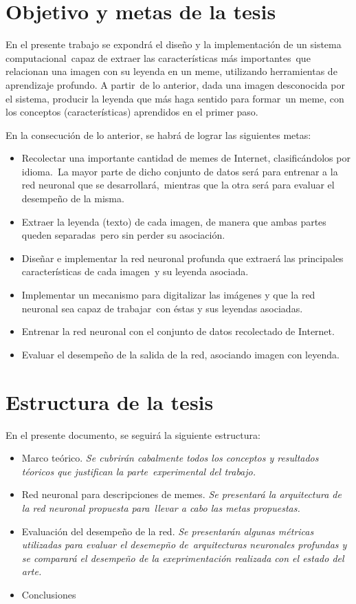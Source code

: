 \section{Objetivo y metas de la tesis}

\noindent
En el presente trabajo se expondrá el diseño y la implementación de un sistema computacional\
capaz de extraer las características más importantes\
que relacionan una imagen con su leyenda en un meme, utilizando herramientas de aprendizaje profundo. A partir\
de lo anterior, dada una imagen desconocida por el sistema, producir la leyenda que más haga sentido para formar\
un meme, con los conceptos (características) aprendidos en el primer paso.\par
En la consecución de lo anterior, se habrá de lograr las siguientes metas:
\begin{itemize}
\item Recolectar una importante cantidad de memes de Internet, clasificándolos por idioma.\
  La mayor parte de dicho conjunto de datos será para entrenar a la red neuronal que se desarrollará,\
  mientras que la otra será para evaluar el desempeño de la misma.
\item Extraer la leyenda (texto) de cada imagen, de manera que ambas partes queden separadas\
  pero sin perder su asociación.
\item Diseñar e implementar la red neuronal profunda que extraerá las principales características de cada imagen\
  y su leyenda asociada.
\item Implementar un mecanismo para digitalizar las imágenes y que la red neuronal sea capaz de trabajar\
  con éstas y sus leyendas asociadas.
\item Entrenar la red neuronal con el conjunto de datos recolectado de Internet.
\item Evaluar el desempeño de la salida de la red, asociando imagen con leyenda.
\end{itemize}

\section{Estructura de la tesis}

\noindent
En el presente documento, se seguirá la siguiente estructura:
\begin{itemize}
\item Marco teórico. \emph{Se cubrirán cabalmente todos los conceptos y resultados téoricos que justifican la parte}\
  \emph{experimental del trabajo.}
\item Red neuronal para descripciones de memes. \emph{Se presentará la arquitectura de la red neuronal propuesta para}\
  \emph{llevar a cabo las metas propuestas.}
\item Evaluación del desempeño de la red. \emph{Se presentarán algunas métricas utilizadas para evaluar el desemepño de}\
  \emph{arquitecturas neuronales profundas y se comparará el desempeño de la exeprimentación realizada con el estado del arte.}
\item Conclusiones
\end{itemize}
